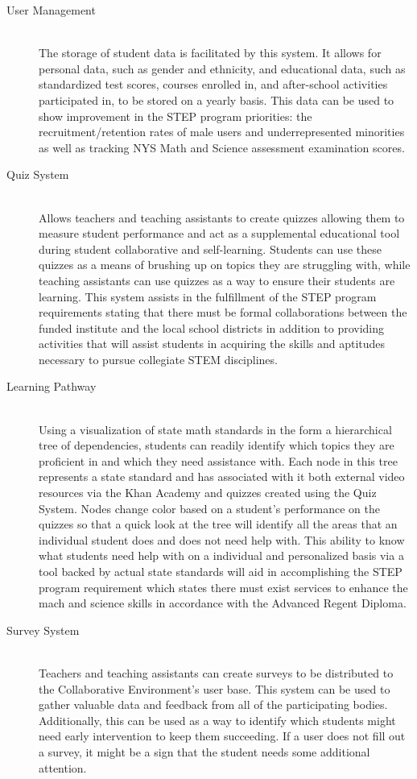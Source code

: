\begin{description}
	\item [User Management] \hfill \\ The storage of student data is facilitated by this system. It allows for personal data, such as gender and ethnicity, and educational data, such as standardized test scores, courses enrolled in, and after-school activities participated in, to be stored on a yearly basis. This data can be used to show improvement in the STEP program priorities: the recruitment/retention rates of male users and underrepresented minorities as well as tracking NYS Math and Science assessment examination scores.
	\item [Quiz System] \hfill \\ Allows teachers and teaching assistants to create quizzes allowing them to measure student performance and act as a supplemental educational tool during student collaborative and self-learning. Students can use these quizzes as a means of brushing up on topics they are struggling with, while teaching assistants can use quizzes as a way to ensure their students are learning. This system assists in the fulfillment of the STEP program requirements stating that there must be formal collaborations between the funded institute and the local school districts in addition to providing activities that will assist students in acquiring the skills and aptitudes necessary to pursue collegiate STEM disciplines.
	\item [Learning Pathway] \hfill \\ Using a visualization of state math standards in the form a hierarchical tree of dependencies, students can readily identify which topics they are proficient in and which they need assistance with. Each node in this tree represents a state standard and has associated with it both external video resources via the Khan Academy and quizzes created using the Quiz System. Nodes change color based on a student's performance on the quizzes so that a quick look at the tree will identify all the areas that an individual student does and does not need help with. This ability to know what students need help with on a individual and personalized basis via a tool backed by actual state standards will aid in accomplishing the STEP program requirement which states there must exist services to enhance the mach and science skills in accordance with the Advanced Regent Diploma.
	\item [Survey System] \hfill \\ Teachers and teaching assistants can create surveys to be distributed to the Collaborative Environment's user base. This system can be used to gather valuable data and feedback from all of the participating bodies. Additionally, this can be used as a way to identify which students might need early intervention to keep them succeeding. If a user does not fill out a survey, it might be a sign that the student needs some additional attention.

\end{description}

